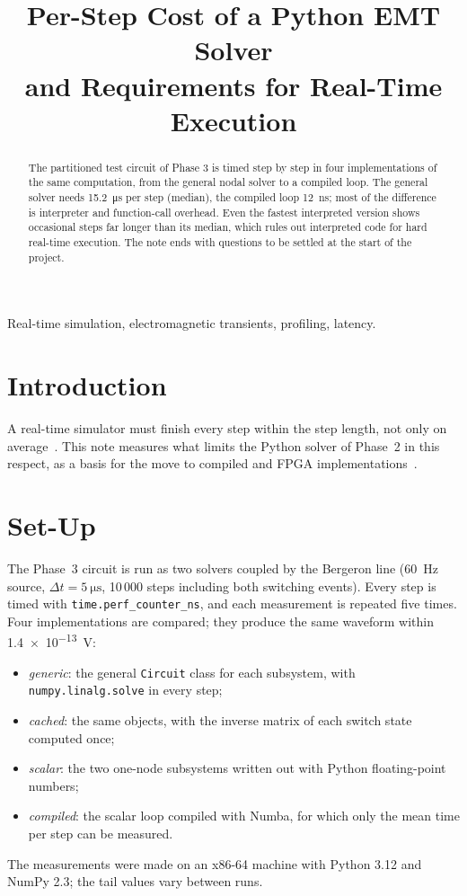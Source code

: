 \documentclass[conference]{IEEEtran}
\begin{document}
\title{Per-Step Cost of a Python EMT Solver\\and Requirements for Real-Time Execution}
\author{
}
\maketitle

\begin{abstract}
The partitioned test circuit of Phase 3 is timed step by step in four implementations of the same computation, from the general nodal solver to a compiled loop. The general solver needs \SI{15.2}{\micro\second} per step (median), the compiled loop \SI{12}{ns}; most of the difference is interpreter and function-call overhead. Even the fastest interpreted version shows occasional steps far longer than its median, which rules out interpreted code for hard real-time execution. The note ends with questions to be settled at the start of the project.
\end{abstract}
\begin{IEEEkeywords}
Real-time simulation, electromagnetic transients, profiling, latency.
\end{IEEEkeywords}

\section{Introduction}
A real-time simulator must finish every step within the step length, not only on average~\cite{faruque}. This note measures what limits the Python solver of Phase~2 in this respect, as a basis for the move to compiled and FPGA implementations~\cite{chen,hls}.

\section{Set-Up}
The Phase~3 circuit is run as two solvers coupled by the Bergeron line (\SI{60}{Hz} source, $\Delta t=\SI{5}{\micro\second}$, 10\,000 steps including both switching events). Every step is timed with \texttt{time.perf\_counter\_ns}, and each measurement is repeated five times. Four implementations are compared; they produce the same waveform within \SI{1.4e-13}{V}:
\begin{itemize}
\item \emph{generic}: the general \texttt{Circuit} class for each subsystem, with \texttt{numpy.linalg.solve} in every step;
\item \emph{cached}: the same objects, with the inverse matrix of each switch state computed once;
\item \emph{scalar}: the two one-node subsystems written out with Python floating-point numbers;
\item \emph{compiled}: the scalar loop compiled with Numba, for which only the mean time per step can be measured.
\end{itemize}
The measurements were made on an x86-64 machine with Python 3.12 and NumPy 2.3; the tail values vary between runs.
\end{document}
